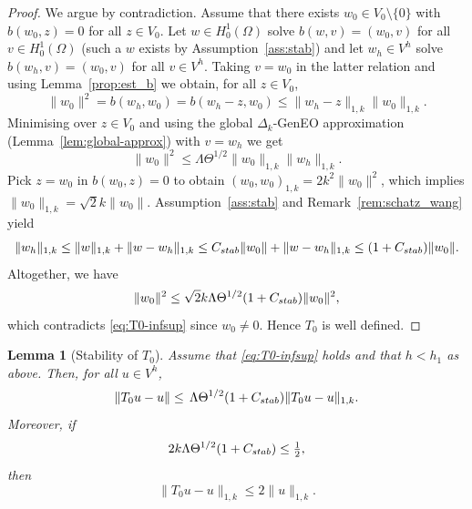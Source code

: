 \documentclass[preprint,3p,times]{elsarticle}
\newcommand{\Cstab}{C_{\textup{\textsf{stab}}}}
\newtheorem{lemma}[theorem]{Lemma}
\theoremstyle{definition}
\numberwithin{equation}{section}
\begin{document}
\begin{proof}
We argue by contradiction.  Assume that there exists $w_0\in V_0\setminus\{0\}$ with
$b(w_0,z)=0$ for all $z\in V_0$.  Let $w\in H^1_0(\Omega)$ solve $b(w,v)=(w_0,v)$
for all $v\in H^1_0(\Omega)$ (such a $w$ exists by Assumption~\ref{ass:stab}) and let $w_h\in V^h$ solve $b(w_h,v)=(w_0,v)$ for all $v\in V^h$.
Taking $v=w_0$ in the latter relation and using Lemma~\ref{prop:est_b} we obtain, for all $z\in V_0$,
\[
	\|w_0\|^2 = b(w_h,w_0) = b(w_h-z,w_0)
	\le \|w_h-z\|_{1,k}\|w_0\|_{1,k}.
\]
Minimising over $z\in V_0$ and using the global $\Delta_k$-GenEO approximation (Lemma~\ref{lem:global-approx}) with $v=w_h$ we get
\begin{equation}\label{ml01}
	\|w_0\|^2 \le \Lambda\Theta^{1/2}\|w_0\|_{1, k}\|w_h\|_{1, k}.
\end{equation}
Pick $z=w_0$ in $b(w_0,z)=0$ to obtain $(w_0,w_0)_{1, k}=2k^2\|w_0\|^2$, which implies $\|w_0\|_{1, k}=\sqrt{2} k\|w_0\|$. 
Assumption~\ref{ass:stab} and Remark~\ref{rem:schatz_wang} yield
\begin{equation}\label{appl_schatz_wang}
	\|w_h\|_{1,k} \le \|w\|_{1,k} + \|w-w_h\|_{1,k} 
	\le \Cstab\|w_0\| + \|w-w_h\|_{1,k} 
	\le (1+\Cstab)\|w_0\|.
\end{equation}
Altogether, we have
\[
	\|w_0\|^2 \le \sqrt{2} k\Lambda\Theta^{1/2}(1+\Cstab)\|w_0\|^2,
\]
which contradicts \eqref{eq:T0-infsup} since $w_0 \ne 0$.  Hence $T_0$ is well defined.
\end{proof}

\begin{lemma}[Stability of $T_0$]\label{lem:T0-stab}
Assume that \eqref{eq:T0-infsup} holds and that $h < h_1$ as above. Then, for all $u\in V^h$,
\begin{equation}\label{eq:T0-L2-energy}
	\|T_0 u - u\| \le \,\Lambda\Theta^{1/2}(1+\Cstab)\|T_0 u - u\|_{1, k} .
\end{equation}
Moreover, if
\begin{equation}\label{eq:T0-extra}
	2k\Lambda\Theta^{1/2}(1+\Cstab) \le \tfrac12,
\end{equation}
then
\begin{equation}\label{eq:T0-energy}
	\|T_0 u - u\|_{1, k} \le 2\|u\|_{1, k}.
\end{equation}
\end{lemma}
\end{document}
